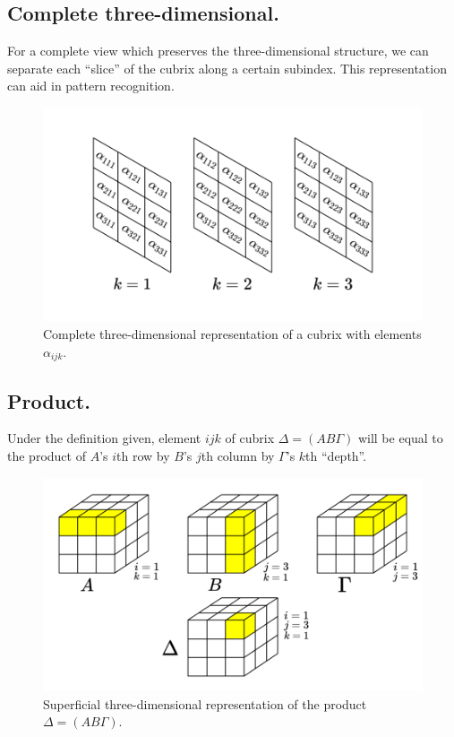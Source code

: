 \newpage

\subsection{Complete three-dimensional.}

For a complete view which preserves the three-dimensional structure, we can separate each ``slice'' of the cubrix along a certain subindex. This representation can aid in pattern recognition.

\begin{figure}[H]
	\includegraphics[width=\linewidth]{media/tridimensional_comp.png}
	\caption{Complete three-dimensional representation of a cubrix with elements $\alpha_{ijk}$.}
\end{figure}

\subsection{Product.}

Under the definition given, element $ijk$ of cubrix $\Delta = (AB\Gamma)$ will be equal to the product of $A$'s $i$th row by $B$'s $j$th column by $\Gamma$'s $k$th ``depth''.

\begin{figure}[H]
	\includegraphics[width=\linewidth]{media/product.png}
	\caption{Superficial three-dimensional representation of the product $\Delta = (AB\Gamma)$.}
\end{figure}

